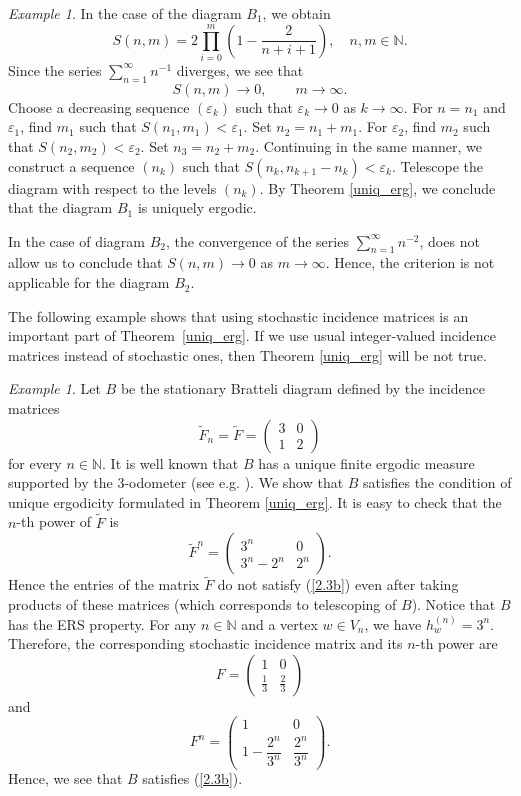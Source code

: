 \documentclass[11pt, english, reqno]{amsart}
\theoremstyle{definition}
\theoremstyle{remark}
\newtheorem{example}[defin]{Example}
\theoremstyle{plain}
\def\tl{\widetilde}
\numberwithin{equation}{section}
\begin{document}
\begin{example}
In the case of the diagram $B_1$, we obtain
$$
S(n,m) = 2\prod_{i = 0}^{m}\left(1 - \frac{2}{n+i+1}\right), \quad
n, m \in \mathbb N.
$$
Since the series $\sum_{n=1}^{\infty} n^{-1}$ diverges, we see
that
$$
S(n,m) \to 0, \qquad m \to \infty.
$$
 Choose a decreasing sequence $(\varepsilon_k)$ such that
 $\varepsilon_k \to 0$ as $k \to \infty$. For $n = n_1$ and
 $\varepsilon_1$, find $m_1$ such that $S(n_1, m_1) < \varepsilon_1$.
 Set $n_2 = n_1 + m_1$. For  $\varepsilon_2$, find $m_2$ such that
 $S(n_2, m_2) < \varepsilon_2$. Set $n_3 = n_2 + m_2$. Continuing
 in the same manner, we construct a sequence $(n_k)$ such
 that $S(n_k, n_{k+1} - n_k) < \varepsilon_k$. Telescope the diagram
 with respect to the levels $(n_k)$. By Theorem
 \ref{uniq_erg}, we conclude that the diagram $B_1$ is uniquely ergodic.

In the case of diagram $B_2$,  the convergence
of the series $\sum_{n=1}^{\infty} n^{-2}$, does not allow us
to conclude that $S(n,m) \to 0$ as $m \to \infty$. Hence, the criterion
is not applicable for the diagram $B_2$.

\end{example}

The following example shows that using stochastic incidence matrices is an
 important part of Theorem~\ref{uniq_erg}. If we use usual 
integer-valued incidence matrices instead of stochastic ones, then Theorem 
\ref{uniq_erg} will be not true.

\begin{example}\label{non-simple-stat-ex}
Let $B$ be the stationary Bratteli diagram defined by the incidence
  matrices
$$
\tl F_n = \tl F =
\begin{pmatrix}
3 & 0\\
1 & 2
\end{pmatrix}
$$
for every $n \in \mathbb N$. It is well known that $B$ has a unique finite
 ergodic  measure supported by the 3-odometer (see e.g.
 \cite{BezuglyiKwiatkowskiMedynetsSolomyak2010}). We show that $B$ 
 satisfies the condition of unique ergodicity formulated in 
 Theorem \ref{uniq_erg}. It is easy to check that the $n$-th power of 
 $\tl F$ is
$$
\tl F^{n} =  
\begin{pmatrix}
3^n & 0\\
3^n - 2^n & 2^n
\end{pmatrix}.
$$
Hence the entries of the matrix $\tl F$ do not satisfy (\ref{2.3b}) even after 
taking products of these matrices (which corresponds to telescoping of $B$).
 Notice that $B$ has the 
ERS property. For any $n \in \mathbb{N}$ and a vertex $w \in V_n$, we 
have $h_w^{(n)} = 3^n$. Therefore, the corresponding stochastic incidence
 matrix and its $n$-th power are
$$
F =
\begin{pmatrix}
1 & 0\\
\frac{1}{3} & \frac{2}{3}
\end{pmatrix}
$$
and
$$
F^{n} =  
\begin{pmatrix}
1 & 0\\
1 - \dfrac{2^n}{3^n} & \dfrac{2^n}{3^n}
\end{pmatrix}.
$$
Hence, we see that $B$ satisfies (\ref{2.3b}).

\end{example}
\end{document}
